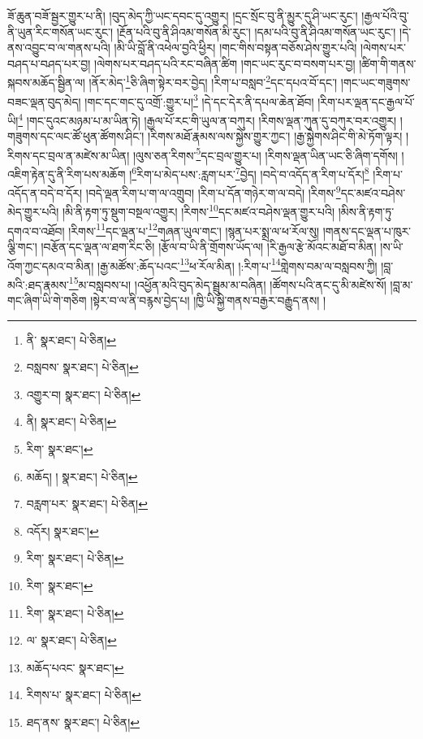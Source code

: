 ཟོ་ཆུན་བཟོ་སྦྱར་གྱུར་པ་ནི། །བུད་མེད་ཀྱི་ཡང་དབང་དུ་འགྱུར། །དྲང་སྲོང་བུ་ནི་མྱུར་དུ་ཤི་ཡང་རུང་། །རྒྱལ་པོའི་བུ་ནི་ཡུན་རིང་གསོན་ཡང་རུང་། །རྔོན་པའི་བུ་ནི་ཤིའམ་གསོན་མི་རུང་། །དམ་པའི་བུ་ནི་ཤིའམ་གསོན་ཡང་རུང་། །དེ་ནས་འབྱུང་བ་ལ་གནས་པའི། །མི་ཡི་བློ་ནི་འཕེལ་བྱའི་ཕྱིར། །གང་གིས་བསྟན་བཅོས་ཤེས་གྱུར་པའི། །ལེགས་པར་བཤད་པ་བཤད་པར་བྱ། །ལེགས་པར་བཤད་པའི་རང་བཞིན་ཚིག །གང་ཡང་རུང་བ་བསག་པར་བྱ། །ཚིག་གི་གནས་སྐབས་མཆོད་སྦྱིན་ལ། །ནོར་མེད་\footnote{ནི་  སྣར་ཐང་།  པེ་ཅིན། }ཅི་ཞིག་སྟེར་བར་བྱེད། །རིག་པ་བསླབ་\footnote{བསླབས་  སྣར་ཐང་།  པེ་ཅིན། }དང་དཔའ་བོ་དང་། །གང་ཡང་གཟུགས་བཟང་ལྡན་བུད་མེད། །གང་དང་གང་དུ་འགྲོ་:གྱུར་པ།\footnote{འགྱུར་བ།  སྣར་ཐང་།  པེ་ཅིན། } །དེ་དང་དེར་ནི་དཔལ་ཆེན་ཐོབ། །རིག་པར་ལྡན་དང་རྒྱལ་པོ་ཡི།\footnote{ནི།  སྣར་ཐང་།  པེ་ཅིན། } །གང་དུའང་མཉམ་པ་མ་ཡིན་ཏེ། །རྒྱལ་པོ་རང་གི་ཡུལ་ན་བཀུར། །རིགས་ལྡན་ཀུན་དུ་བཀུར་བར་འགྱུར། །གཟུགས་དང་ལང་ཚོ་ཕུན་ཚོགས་ཤིང་། །རིགས་མཐོ་རྣམས་ལས་སྐྱེས་གྱུར་ཀྱང་། །རྒྱ་སྐྱེགས་ཤིང་གི་མེ་ཏོག་ལྟར། །རིགས་དང་བྲལ་ན་མཛེས་མ་ཡིན། །ལུས་ཅན་རིགས་\footnote{རིག་  སྣར་ཐང་། }དང་བྲལ་གྱུར་པ། །རིགས་ལྡན་ཡིན་ཡང་ཅི་ཞིག་དགོས། །འཇིག་རྟེན་དུ་ནི་རིག་པས་མཆོག །\footnote{མཆོད། །  སྣར་ཐང་།  པེ་ཅིན། }རིག་པ་མེད་པས་:རླག་པར་\footnote{བརླག་པར་  སྣར་ཐང་།  པེ་ཅིན། }བྱེད། །བདེ་བ་འདོད་ན་རིག་པ་དོར།\footnote{འདོར།  སྣར་ཐང་། } །རིག་པ་འདོད་ན་བདེ་བ་དོར། །བདེ་ལྡན་རིག་པ་ག་ལ་འགྲུབ། །རིག་པ་དོན་གཉེར་ག་ལ་བདེ། །རིགས་\footnote{རིག་  སྣར་ཐང་།  པེ་ཅིན། }དང་མཛའ་བཤེས་མེད་གྱུར་པའི། །མི་ནི་རྟག་ཏུ་སྡུག་བསྔལ་འགྱུར། །རིགས་\footnote{རིག་  སྣར་ཐང་། }དང་མཛའ་བཤེས་ལྡན་གྱུར་པའི། །མིས་ནི་རྟག་ཏུ་དགའ་བ་འཐོབ། །རིགས་\footnote{རིག་  སྣར་ཐང་།  པེ་ཅིན། }དང་ལྡན་པ་\footnote{ལ་  སྣར་ཐང་།  པེ་ཅིན། }གཞན་ཡུལ་གང་། །སྙན་པར་སྨྲ་ལ་ཕ་རོལ་སུ། །གནས་དང་ལྡན་པ་ཁུར་ལྕི་གང་། །བརྩོན་དང་ལྡན་ལ་ཐག་རིང་ཅི། །རྩོལ་བ་ཡི་ནི་གྲོགས་ཡོད་ལ། །རི་རྒྱལ་རྩེ་མོའང་མཐོ་བ་མིན། །ས་ཡི་འོག་ཀྱང་དམའ་བ་མིན། །རྒྱ་མཚོས་:ཆོད་པའང་\footnote{མཆོད་པའང་  སྣར་ཐང་། }ཕ་རོལ་མིན། །:རིག་པ་\footnote{རིགས་པ་  སྣར་ཐང་།  པེ་ཅིན། }གླེགས་བམ་ལ་བསླབས་ཀྱི། །བླ་མའི་:ཐད་རྣམས་\footnote{ཐད་ནས་  སྣར་ཐང་།  པེ་ཅིན། }མ་བསླབས་པ། །འཕྱོན་མའི་བུད་མེད་སྦྲུམ་མ་བཞིན། །ཚོགས་པའི་ནང་དུ་མི་མཛེས་སོ། །བླ་མ་གང་ཞིག་ཡི་གེ་གཅིག །སྟེར་བ་ལ་ནི་བརྙས་བྱེད་པ། །ཁྱི་ཡི་སྐྱེ་གནས་བརྒྱར་བརྒྱུད་ནས། །

